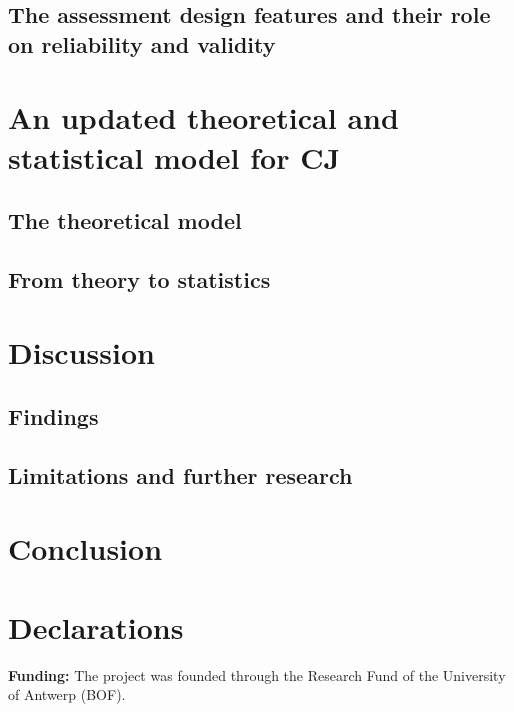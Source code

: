 \documentclass[
  authoryear,
  preprint,
  1p]{elsarticle}
\begin{document}
\subsection{The assessment design features and their role on reliability
and validity}\label{sec-theory-issue3}

\section{An updated theoretical and statistical model for
CJ}\label{sec-theory}

\subsection{The theoretical model}\label{sec-theory-theoretical}

\subsection{From theory to statistics}\label{sec-theory-statistics}

\section{Discussion}\label{sec-discuss}

\subsection{Findings}\label{sec-discuss-finding}

\subsection{Limitations and further
research}\label{sec-discuss-limitations}

\section{Conclusion}\label{sec-conclusion}

\newpage{}

\section*{Declarations}\label{declarations}

\textbf{Funding:} The project was founded through the Research Fund of
the University of Antwerp (BOF).
\end{document}
